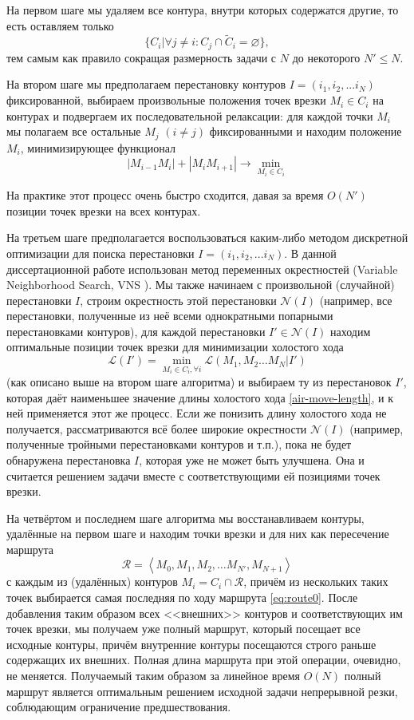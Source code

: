 На первом шаге мы удаляем все контура,
внутри которых содержатся другие,
то есть оставляем только
$$
\{C_i \vert \forall j \ne i\colon C_j \cap \widetilde C_i = \varnothing \},
$$
тем самым как правило сокращая размерность задачи с $N$
до некоторого $N' \leqslant N$.

На втором шаге мы предполагаем перестановку контуров
$I = (i_1, i_2, ... i_N)$
фиксированной,
выбираем произвольные положения точек врезки
$M_i \in C_i$ на контурах и подвергаем их последовательной релаксации:
для каждой точки $M_i$
мы полагаем все остальные $M_j$ $(i\ne j)$ фиксированными и находим
положение $M_i$, минимизирующее функционал
$$
|M_{i-1}M_i|+|M_iM_{i+1}| \to \min_{M_i \in C_i}
$$

На практике этот процесс очень быстро сходится,
давая за время $O(N')$
позиции точек врезки на всех контурах.

На третьем шаге предполагается воспользоваться каким-либо
методом дискретной оптимизации для поиска перестановки
$I = (i_1, i_2, ... i_N)$.
В данной диссертационной работе использован метод
переменных окрестностей
(Variable Neighborhood Search,
VNS
\autocite{bi:VNS}).
Мы также начинаем с произвольной
(случайной) перестановки $I$,
строим окрестность этой перестановки
$\mathcal N(I)$
(например, все перестановки,
полученные из неё всеми однократными попарными перестановками контуров),
для каждой перестановки $I'\in \mathcal N(I)$
находим оптимальные позиции точек врезки
для минимизации холостого хода
$$
\mathcal L (I') = \min_{M_i\in C_i, \forall i}
  \mathcal L (M_1, M_2 \dots M_N | I')
$$
(как описано выше на втором шаге алгоритма)
и выбираем ту из перестановок $I'$,
которая даёт наименьшее значение длины
холостого хода \eqref{air-move-length},
и к ней применяется этот же процесс.
Если же понизить длину холостого хода не получается,
рассматриваются всё более широкие окрестности
$\mathcal N(I)$
(например, полученные тройными перестановками контуров
и т.п.),
пока не будет обнаружена перестановка $I$,
которая уже не может быть улучшена.
Она и считается решением задачи
вместе с соответствующими ей позициями точек врезки.

На четвёртом и последнем шаге алгоритма
мы восстанавливаем контуры,
удалённые на первом шаге и находим точки
врезки и для них как пересечение маршрута
\begin{equation}
  \label{eq:route0}
  \mathcal R = \left< M_0, M_1, M_2, \dots M_{N'}, M_{N+1}\right>
\end{equation}
с каждым из (удалённых) контуров
$M_i = C_i \cap \mathcal R$,
причём из нескольких таких точек
выбирается самая последняя по ходу маршрута
\eqref{eq:route0}.
После добавления таким образом всех
<<внешних>> контуров
и соответствующих им точек врезки,
мы получаем уже полный маршрут,
который посещает все исходные контуры,
причём внутренние контуры посещаются
строго раньше содержащих их внешних.
Полная длина маршрута
при этой операции,
очевидно,
не меняется.
Получаемый таким образом
за линейное время
$O(N)$
полный маршрут
является оптимальным решением исходной задачи
непрерывной резки,
соблюдающим
ограничение предшествования.

